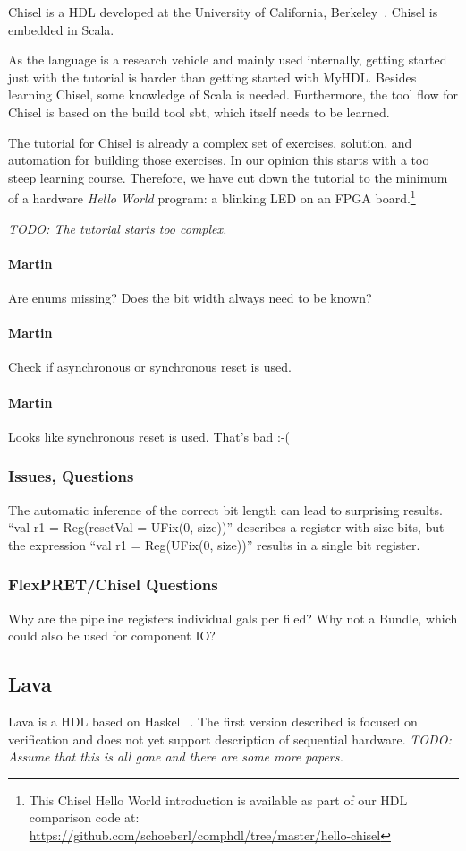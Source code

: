 \documentclass[10pt, technote, draftcls, onecolumn]{IEEEtran}
\newcommand{\todo}[1]{{\emph{TODO: #1}}}
\newcommand{\comment}[3]{\paragraph*{\textbf{#1}}{\color{#3}#2}}
\newcommand{\martin}[1]{\comment{Martin}{#1}{Blue}}
\begin{document}
Chisel is a HDL developed at the University of California, Berkeley~\cite{chisel:dac2012}.
Chisel is embedded in Scala.

As the language is a research vehicle and mainly used internally, getting
started just with the tutorial is harder than getting started with MyHDL.
Besides learning Chisel, some knowledge of Scala is needed. Furthermore,
the tool flow for Chisel is based on the build tool sbt, which itself needs to
be learned.

The tutorial for Chisel is already a complex set of exercises, solution, and
automation for building those exercises. In our opinion this starts with a
too steep learning course. Therefore, we have cut down the tutorial to
the minimum of a hardware \emph{Hello World} program: a blinking LED
on an FPGA board.\footnote{This Chisel Hello World introduction is
available as part of our HDL comparison code at:
\url{https://github.com/schoeberl/comphdl/tree/master/hello-chisel}}

\todo{The tutorial starts too complex.}

\martin{Are enums missing? Does the bit width always need to be known?}

\martin{Check if asynchronous or synchronous reset is used.}

\martin{Looks like synchronous reset is used. That's bad :-(}

\subsubsection{Issues, Questions}

The automatic inference of the correct bit length can lead to surprising
results. ``val r1 = Reg(resetVal = UFix(0, size))'' describes a register with
size bits, but the expression ``val r1 = Reg(UFix(0, size))'' results in a single
bit register.

\subsubsection{FlexPRET/Chisel Questions}

Why are the pipeline registers individual gals per filed? Why not a Bundle,
which could also be used for component IO?

\subsection{Lava}

Lava is a HDL based on Haskell~\cite{Lava:1998}. The first version described
is focused on verification and does not yet support description of sequential
hardware. \todo{Assume that this is all gone and there are some more papers.}
\end{document}
